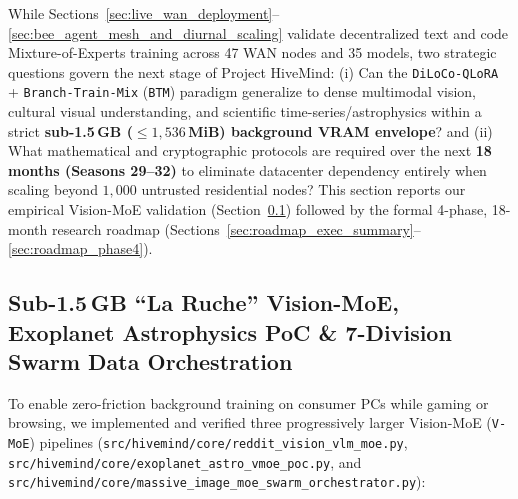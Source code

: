 \documentclass[11pt,a4paper]{article}
\begin{document}
While Sections~\ref{sec:live_wan_deployment}--\ref{sec:bee_agent_mesh_and_diurnal_scaling} validate decentralized text and code Mixture-of-Experts training across 47 WAN nodes and 35 models, two strategic questions govern the next stage of Project HiveMind: (i) Can the \texttt{DiLoCo-QLoRA} + \texttt{Branch-Train-Mix} (\texttt{BTM}) paradigm generalize to dense multimodal vision, cultural visual understanding, and scientific time-series/astrophysics within a strict \textbf{sub-1.5\,GB ($\le 1{,}536$\,MiB) background VRAM envelope}? and (ii) What mathematical and cryptographic protocols are required over the next \textbf{18 months (Seasons 29--32)} to eliminate datacenter dependency entirely when scaling beyond $1{,}000$ untrusted residential nodes? This section reports our empirical Vision-MoE validation (Section~\ref{sec:vmoe_exoplanet_and_swarm_orchestrator}) followed by the formal 4-phase, 18-month research roadmap (Sections~\ref{sec:roadmap_exec_summary}--\ref{sec:roadmap_phase4}).

\subsection{Sub-1.5\,GB ``La Ruche'' Vision-MoE, Exoplanet Astrophysics PoC \& 7-Division Swarm Data Orchestration}
\label{sec:vmoe_exoplanet_and_swarm_orchestrator}

To enable zero-friction background training on consumer PCs while gaming or browsing, we implemented and verified three progressively larger Vision-MoE (\texttt{V-MoE}) pipelines (\texttt{src/\allowbreak hivemind/\allowbreak core/\allowbreak reddit\_vision\_vlm\_moe.py}, \texttt{src/\allowbreak hivemind/\allowbreak core/\allowbreak exoplanet\_astro\_vmoe\_poc.py}, and \texttt{src/\allowbreak hivemind/\allowbreak core/\allowbreak massive\_image\_moe\_swarm\_orchestrator.py}):
\end{document}
